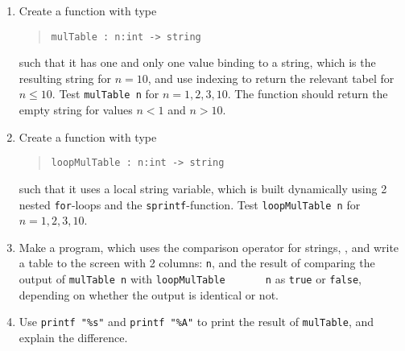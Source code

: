 \begin{enumerate}
\item Create a function with type
  \begin{quote}
    \mbox{\lstinline!mulTable : n:int -> string!}
  \end{quote}
  such that it has one and only one value binding to a string, which
  is the resulting string for $n=10$, and use indexing to return the
  relevant tabel for $n\leq 10$.  Test \mbox{\lstinline!mulTable n!}
  for $n= 1, 2, 3, 10$.  The function should return the empty string
  for values $n < 1$ and $n>10$.
\item Create a function with type
  \begin{quote}
    \mbox{\lstinline!loopMulTable : n:int -> string!}
  \end{quote}
  such that it uses a local string variable, which is built
  dynamically using 2 nested \lstinline!for!-loops and the \lstinline!sprintf!-function.  Test \mbox{\lstinline!loopMulTable n!} for $n= 1, 2, 3, 10$.
  \item Make a program, which uses the comparison operator for
    strings, \lexeme{=}, and write a table to the screen with 2
    columns: \lstinline!n!, and the result of comparing the output of
    \mbox{\lstinline!mulTable n!} with \mbox{\lstinline!loopMulTable
      n!} as \lstinline!true! or \lstinline!false!, depending on
    whether the output is identical or not.
  \item Use \lstinline!printf "%s"!%
    and \lstinline!printf "%A"!%
    to print the result of \lstinline!mulTable!, and explain the difference.
  \end{enumerate}
